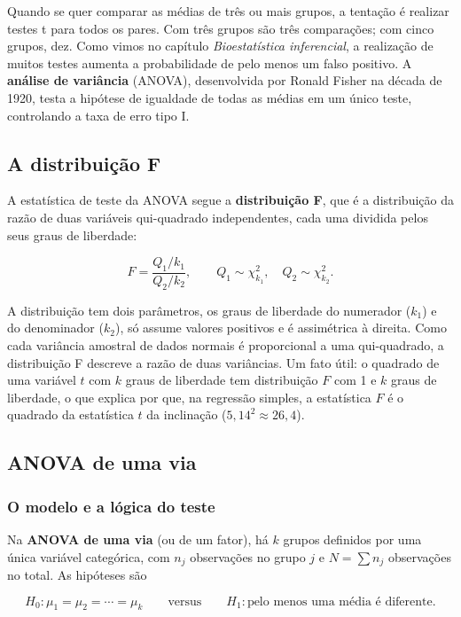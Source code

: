 \documentclass[
]{book}
\begin{document}
Quando se quer comparar as médias de três ou mais grupos, a tentação é realizar testes t para todos os pares. Com três grupos são três comparações; com cinco grupos, dez. Como vimos no capítulo \emph{Bioestatística inferencial}, a realização de muitos testes aumenta a probabilidade de pelo menos um falso positivo. A \textbf{análise de variância} (ANOVA), desenvolvida por Ronald Fisher na década de 1920, testa a hipótese de igualdade de todas as médias em um único teste, controlando a taxa de erro tipo I.

\subsection{A distribuição F}\label{a-distribuiuxe7uxe3o-f}

A estatística de teste da ANOVA segue a \textbf{distribuição F}, que é a distribuição da razão de duas variáveis qui-quadrado independentes, cada uma dividida pelos seus graus de liberdade:

\[
F = \frac{Q_1/k_1}{Q_2/k_2}, \qquad Q_1 \sim \chi^2_{k_1}, \quad Q_2 \sim \chi^2_{k_2}.
\]

A distribuição tem dois parâmetros, os graus de liberdade do numerador (\(k_1\)) e do denominador (\(k_2\)), só assume valores positivos e é assimétrica à direita. Como cada variância amostral de dados normais é proporcional a uma qui-quadrado, a distribuição F descreve a razão de duas variâncias. Um fato útil: o quadrado de uma variável \(t\) com \(k\) graus de liberdade tem distribuição \(F\) com 1 e \(k\) graus de liberdade, o que explica por que, na regressão simples, a estatística \(F\) é o quadrado da estatística \(t\) da inclinação (\(5{,}14^2 \approx 26{,}4\)).

\subsection{ANOVA de uma via}\label{anova-de-uma-via}

\subsubsection{O modelo e a lógica do teste}\label{o-modelo-e-a-luxf3gica-do-teste}

Na \textbf{ANOVA de uma via} (ou de um fator), há \(k\) grupos definidos por uma única variável categórica, com \(n_j\) observações no grupo \(j\) e \(N = \sum n_j\) observações no total. As hipóteses são

\[
H_0\colon \mu_1 = \mu_2 = \cdots = \mu_k \qquad \text{versus} \qquad H_1\colon \text{pelo menos uma média é diferente}.
\]
\end{document}
